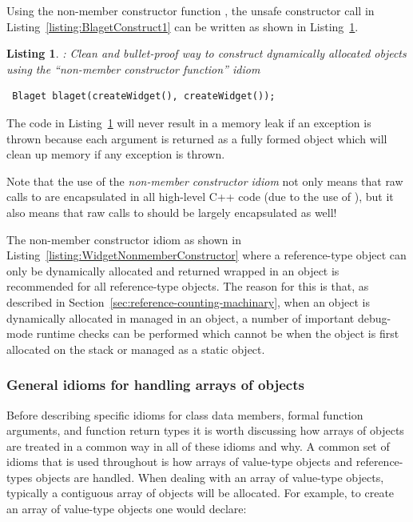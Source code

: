 \documentclass[pdf,ps2pdf,11pt]{SANDreport}
\newtheorem{listing}{Listing}
\begin{document}
Using the non-member constructor function {}, the
unsafe constructor call in Listing~\ref{listing:BlagetConstruct1}
can be written as shown in Listing~\ref{listing:BlagetConstruct3}.

{}\begin{listing}: Clean and bullet-proof way to construct dynamically
allocated objects using the ``non-member constructor function'' idiom
\label{listing:BlagetConstruct3}
{\small\begin{verbatim} Blaget blaget(createWidget(), createWidget());
\end{verbatim}}
\end{listing}

The code in Listing~\ref{listing:BlagetConstruct3} will never result
in a memory leak if an exception is thrown because each argument is
returned as a fully formed {} object which will clean up
memory if any exception is thrown.

Note that the use of the {}\textit{non-member constructor idiom} not
only means that raw calls to {} are encapsulated in all
high-level C++ code (due to the use of {}), but it also means
that raw calls to {} should be largely encapsulated as well!

The non-member constructor idiom as shown in
Listing~\ref{listing:WidgetNonmemberConstructor} where a
reference-type object can only be dynamically allocated and returned
wrapped in an {} object is recommended for all reference-type
objects.  The reason for this is that, as described in
Section~\ref{sec:reference-counting-machinary}, when an object is
dynamically allocated in managed in an {} object, a number of
important debug-mode runtime checks can be performed which cannot be
when the object is first allocated on the stack or managed as a static
object.


%
{}\subsubsection{General idioms for handling arrays of objects}
\label{sec:general-array-idioms}
%

Before describing specific idioms for class data members, formal
function arguments, and function return types it is worth discussing
how arrays of objects are treated in a common way in all of these
idioms and why.  A common set of idioms that is used throughout is how
arrays of value-type objects and reference-types objects are handled.
When dealing with an array of value-type objects, typically a
contiguous array of objects will be allocated.  For example, to create
an array of value-type objects one would declare:
\end{document}
